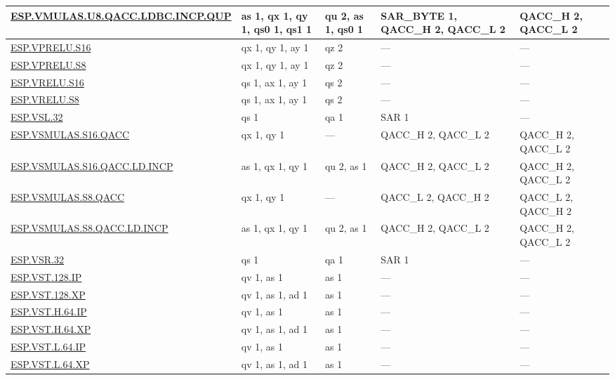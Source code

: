 \begin{longtable}[c]{|l|m{2.5cm}|m{2.5cm}|m{2.5cm}|m{2.5cm}|}
    \hyperref[instruction:ESPVMULASU8QACCLDBCINCPQUP]{ESP.VMULAS.U8.QACC.LDBC.INCP.QUP} & as 1, qx 1, qy 1, qs0 1, qs1 1 & qu 2, as 1, qs0 1 & SAR\_BYTE 1, QACC\_H 2, QACC\_L 2 & QACC\_H 2, QACC\_L 2\\\hline
    \hyperref[instruction:ESPVPRELUS16]{ESP.VPRELU.S16} & qx 1, qy 1, ay 1 & qz 2 & — & — \\\hline
    \hyperref[instruction:ESPVPRELUS8]{ESP.VPRELU.S8} & qx 1, qy 1, ay 1 & qz 2 & — & — \\\hline
    \hyperref[instruction:ESPVRELUS16]{ESP.VRELU.S16} & qs 1, ax 1, ay 1 & qs 2 & — & — \\\hline
    \hyperref[instruction:ESPVRELUS8]{ESP.VRELU.S8} & qs 1, ax 1, ay 1 & qs 2 & — & — \\\hline
    \hyperref[instruction:ESPVSL32]{ESP.VSL.32} & qs 1 & qa 1 & SAR 1 & — \\\hline
    \hyperref[instruction:ESPVSMULASS16QACC]{ESP.VSMULAS.S16.QACC} & qx 1, qy 1 & — & QACC\_H 2, QACC\_L 2 & QACC\_H 2, QACC\_L 2\\\hline
    \hyperref[instruction:ESPVSMULASS16QACCLDINCP]{ESP.VSMULAS.S16.QACC.LD.INCP} & as 1, qx 1, qy 1 & qu 2, as 1 & QACC\_H 2, QACC\_L 2 & QACC\_H 2, QACC\_L 2\\\hline
    \hyperref[instruction:ESPVSMULASS8QACC]{ESP.VSMULAS.S8.QACC} & qx 1, qy 1 & — & QACC\_L 2, QACC\_H 2 & QACC\_L 2, QACC\_H 2\\\hline
    \hyperref[instruction:ESPVSMULASS8QACCLDINCP]{ESP.VSMULAS.S8.QACC.LD.INCP} & as 1, qx 1, qy 1 & qu 2, as 1 & QACC\_H 2, QACC\_L 2 & QACC\_H 2, QACC\_L 2\\\hline
    \hyperref[instruction:ESPVSR32]{ESP.VSR.32} & qs 1 & qa 1 & SAR 1 & — \\\hline
    \hyperref[instruction:ESPVST128IP]{ESP.VST.128.IP} & qv 1, as 1 & as 1 & — & — \\\hline
    \hyperref[instruction:ESPVST128XP]{ESP.VST.128.XP} & qv 1, as 1, ad 1 & as 1 & — & — \\\hline
    \hyperref[instruction:ESPVSTH64IP]{ESP.VST.H.64.IP} & qv 1, as 1 & as 1 & — & — \\\hline
    \hyperref[instruction:ESPVSTH64XP]{ESP.VST.H.64.XP} & qv 1, as 1, ad 1 & as 1 & — & — \\\hline
    \hyperref[instruction:ESPVSTL64IP]{ESP.VST.L.64.IP} & qv 1, as 1 & as 1 & — & — \\\hline
    \hyperref[instruction:ESPVSTL64XP]{ESP.VST.L.64.XP} & qv 1, as 1, ad 1 & as 1 & — & — \\\hline

\end{longtable}

